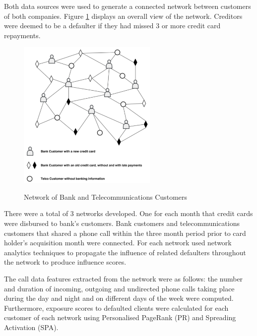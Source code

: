 Both data sources were used to generate a connected network between customers of both companies. Figure \ref{fig:network} displays an overall view of the network. Creditors were deemed to be a defaulter if they had missed 3 or more credit card repayments. 

\vspace{10pt}

\begin{figure}[!htb]
\centering
\includegraphics[width=0.6\textwidth]{images/network.png}
\caption{Network of Bank and Telecommunications Customers}
\parencite{BigDataMicroFiance}
\label{fig:network}
\end{figure}

\vspace{10pt}

 There were a total of 3 networks developed. One for each month that credit cards were disbursed to bank's customers. Bank customers and telecommunications customers that shared a phone call within the three month period prior to card holder's acquisition month were connected. For each network \textcite{BigDataMicroFiance} used network analytics techniques to  propagate the influence of related defaulters throughout the network to produce influence scores. \newpage
 
 The call data features extracted from the network were as follows: the number and duration of incoming, outgoing and undirected phone calls taking place during the day and night and on different days of the week were computed. Furthermore, exposure scores to defaulted clients were calculated for each customer of each network using Personalised PageRank (PR) and Spreading Activation (SPA). \\
 

